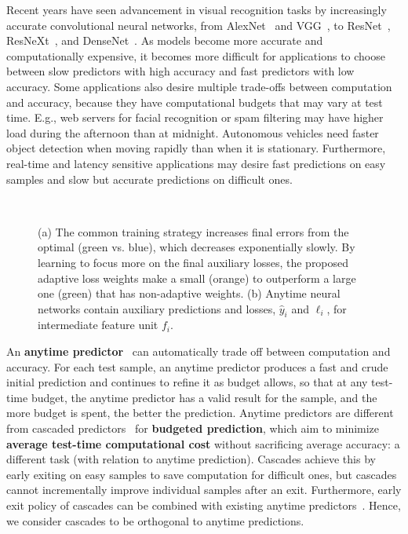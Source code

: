 Recent years have seen advancement in visual recognition tasks
by increasingly accurate convolutional neural networks, from AlexNet~\cite{alexnet} and VGG~\cite{vgg}, to ResNet~\cite{resnet}, ResNeXt~\cite{resnext}, and DenseNet~\cite{densenet}. 
As models become more accurate and computationally expensive, it becomes more difficult for applications to choose between slow predictors with high accuracy and fast predictors with low accuracy. 
Some applications also desire multiple trade-offs between computation and accuracy, because they have computational budgets that may vary at test time. E.g., web servers for facial recognition or spam filtering may have higher load during the afternoon than at midnight.  Autonomous vehicles need faster object detection when moving rapidly than when it is stationary.  Furthermore, real-time and latency sensitive applications may desire fast predictions on easy samples and slow but accurate predictions on difficult ones. 
\begin{figure}
    \centering
    ~
    \caption{(a) The common \ann training strategy increases final errors from the optimal (green vs. blue), which decreases exponentially slowly. By learning to focus more on the final auxiliary losses, the proposed adaptive loss weights make a small \ann (orange) to outperform a large one (green) that has non-adaptive weights. 
    (b) Anytime neural networks contain auxiliary predictions and losses, $\hat{y}_i$ and $\ell_i$, for intermediate feature unit $f_i$.}
\end{figure}

An \textbf{anytime predictor}~\cite{horvitz:1987,boddydean,anytime,speedboost,msdense} can automatically trade off between computation and accuracy. For each test sample, an anytime predictor produces a fast and crude initial prediction and continues to refine it as budget allows, so that at any test-time budget, the anytime predictor has a valid result for the sample, and the more budget is spent, the better the prediction. 
Anytime predictors are different from cascaded predictors~\cite{cascade,xu:14,cai:15,adaptivenn,cascade_nn} for \textbf{budgeted prediction}, which aim to minimize \textbf{average test-time computational cost} without sacrificing average accuracy: a different task (with relation to anytime prediction). Cascades achieve this by early exiting on easy samples to save computation for difficult ones, but cascades cannot incrementally improve individual samples after an exit. Furthermore, early exit policy of cascades can be combined with existing anytime predictors~\cite{adaptivenn,cascade_nn}. Hence, we consider cascades to be orthogonal to anytime predictions.




